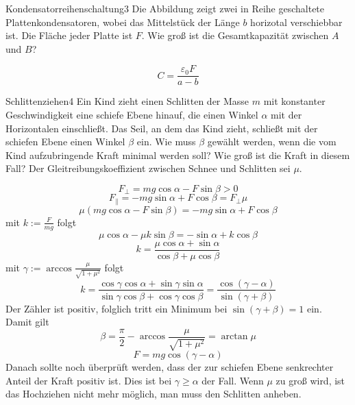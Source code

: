 


\begin{problem}{Kondensatorreihenschaltung}{3}
Die Abbildung zeigt zwei in Reihe geschaltete Plattenkondensatoren, wobei das Mittelstück der Länge $b$ horizotal verschiebbar ist. Die Fläche jeder Platte ist $F$. Wie groß ist die Gesamtkapazität zwischen $A$ und $B$?

\begin{solution}
\[
C=\frac{\varepsilon_0 F}{a-b}
\]
\end{solution}
\end{problem}

\begin{problem}{Schlittenziehen}{4}
Ein Kind zieht einen Schlitten der Masse $m$ mit konstanter Geschwindigkeit eine schiefe Ebene hinauf, die einen Winkel $\alpha$ mit der Horizontalen einschließt. Das Seil, an dem das Kind zieht, schließt mit der schiefen Ebene einen Winkel $\beta$ ein. Wie muss $\beta$ gewählt werden, wenn die vom Kind aufzubringende Kraft minimal werden soll? Wie groß ist die Kraft in diesem Fall? Der Gleitreibungskoeffizient zwischen Schnee und Schlitten sei $\mu$.
\begin{solution}
\[
F_{\perp}=mg \cos\alpha - F \sin\beta>0
\]
\[
F_{\parallel}=-mg \sin\alpha +F \cos\beta =F_{\perp} \mu
\]
\[
\mu\left(mg \cos\alpha-F \sin\beta \right)=-mg \sin\alpha+F \cos\beta
\]
mit $k:=\frac{F}{mg}$ folgt
\[
\mu \cos\alpha - \mu k \sin\beta=-\sin\alpha+k \cos\beta
\]
\[
k=\frac{\mu \cos\alpha+\sin\alpha}{\cos\beta + \mu\cos\beta} 
\]
mit $\gamma:=\arccos\frac{\mu}{\sqrt{1+\mu^2}}$ folgt
\[
k=\frac{\cos\gamma\cos\alpha+\sin\gamma\sin\alpha}{\sin\gamma\cos\beta + \cos\gamma\cos\beta}=\frac{\cos(\gamma-\alpha)}{\sin(\gamma+\beta)}
\]
Der Zähler ist positiv, folglich tritt ein Minimum bei $\sin(\gamma+\beta)=1$ ein. Damit gilt
\[
\beta=\frac\pi 2-\arccos\frac{\mu}{\sqrt{1+\mu^2}}=\arctan\mu
\]
\[
F=mg \cos(\gamma-\alpha)
\]
Danach sollte noch überprüft werden, dass der zur schiefen Ebene senkrechter Anteil der Kraft positiv ist. Dies ist bei $\gamma \geq \alpha$ der Fall. Wenn $\mu$ zu groß wird, ist das Hochziehen nicht mehr möglich, man muss den Schlitten anheben.
\end{solution}
\end{problem}

